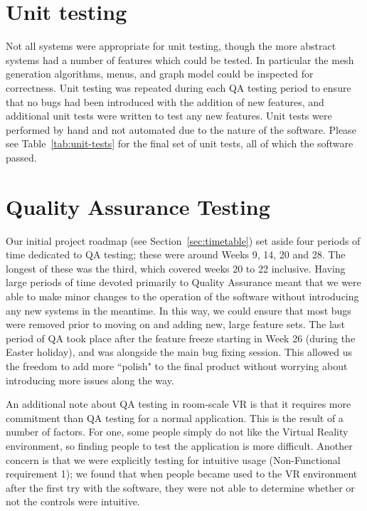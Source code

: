 \section{Unit testing}

Not all systems were appropriate for unit testing, though the more abstract systems had a number of features which could be tested. In particular the mesh generation algorithms, menus, and graph model could be inspected for correctness. Unit testing was repeated during each QA testing period to ensure that no bugs had been introduced with the addition of new features, and additional unit tests were written to test any new features. Unit tests were performed by hand and not automated due to the nature of the software. Please see Table~\ref{tab:unit-tests} for the final set of unit tests, all of which the software passed.

\section{Quality Assurance Testing}

Our initial project roadmap (see Section~\ref{sec:timetable}) set aside four periods of time dedicated to QA testing; these were around Weeks 9, 14, 20 and 28. The longest of these was the third, which covered weeks 20 to 22 inclusive. Having large periods of time devoted primarily to Quality Assurance meant that we were able to make minor changes to the operation of the software without introducing any new systems in the meantime. In this way, we could ensure that most bugs were removed prior to moving on and adding new, large feature sets. The last period of QA took place after the feature freeze starting in Week 26 (during the Easter holiday), and was alongside the main bug fixing session. This allowed us the freedom to add more ``polish" to the final product without worrying about introducing more issues along the way.

An additional note about QA testing in room-scale VR is that it requires more commitment than QA testing for a normal application. This is the result of a number of factors. For one, some people simply do not like the Virtual Reality environment, so finding people to test the application is more difficult. Another concern is that we were explicitly testing for intuitive usage (Non-Functional requirement 1); we found that when people became used to the VR environment after the first try with the software, they were not able to determine whether or not the controls were intuitive. 

